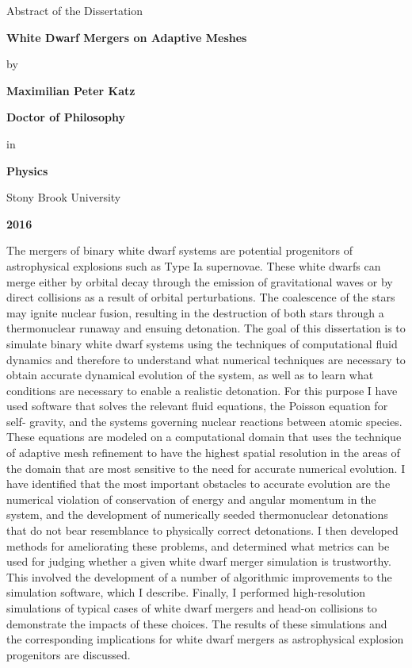 \documentclass[12pt]{article}
\begin{document}
\newpage

\centerline{Abstract of the Dissertation}
\vspace*{1\baselineskip}
\centerline{\bf{White Dwarf Mergers on Adaptive Meshes}}
\vspace*{1\baselineskip}
\centerline{by}
\vspace*{1\baselineskip}
\centerline{\bf{Maximilian Peter Katz}}
\vspace*{1\baselineskip}
\centerline{\bf{Doctor of Philosophy}}
\vspace*{1\baselineskip}
\centerline{in}
\vspace*{1\baselineskip}
\centerline{\bf{Physics}}
\vspace*{1\baselineskip}
\centerline{Stony Brook University}
\vspace*{1\baselineskip}
\centerline{\bf{2016}}
\vspace*{2\baselineskip}
The mergers of binary white dwarf systems are potential progenitors of astrophysical
explosions such as Type Ia supernovae. These white dwarfs can merge either by orbital
decay through the emission of gravitational waves or by direct collisions as a result of
orbital perturbations. The coalescence of the stars may ignite nuclear fusion, resulting in
the destruction of both stars through a thermonuclear runaway and ensuing detonation.
The goal of this dissertation is to simulate binary white dwarf systems using the
techniques of computational fluid dynamics and therefore to understand what numerical
techniques are necessary to obtain accurate dynamical evolution of the system, as well as
to learn what conditions are necessary to enable a realistic detonation. For this purpose I
have used software that solves the relevant fluid equations, the Poisson equation for self-
gravity, and the systems governing nuclear reactions between atomic species. These
equations are modeled on a computational domain that uses the technique of adaptive
mesh refinement to have the highest spatial resolution in the areas of the domain that are
most sensitive to the need for accurate numerical evolution. I have identified that the
most important obstacles to accurate evolution are the numerical violation of
conservation of energy and angular momentum in the system, and the development of
numerically seeded thermonuclear detonations that do not bear resemblance to physically
correct detonations. I then developed methods for ameliorating these problems, and
determined what metrics can be used for judging whether a given white dwarf merger
simulation is trustworthy. This involved the development of a number of algorithmic
improvements to the simulation software, which I describe. Finally, I performed high-resolution
simulations of typical cases of white dwarf mergers and head-on collisions to
demonstrate the impacts of these choices. The results of these simulations and the
corresponding implications for white dwarf mergers as astrophysical explosion
progenitors are discussed.
\end{document}

